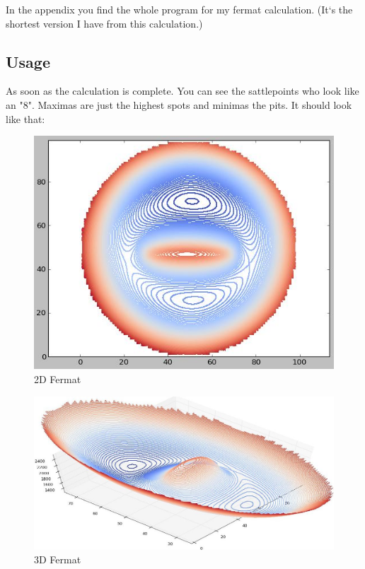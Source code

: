 \documentclass[pdftex,12pt,a4paper]{article}
\begin{document}
In the appendix you find the whole program for my fermat calculation. (It`s the shortest version I have from this calculation.)

\subsection{Usage}

As soon as the calculation is complete. You can see the sattlepoints who look like an "8". Maximas are just the highest spots and minimas the pits. It should look like that:

\begin{figure}[position=h]
\centering
 \caption{2D Fermat}
 \includegraphics[width=12cm]{Bilder/Fermat2}%
\end{figure}

\begin{figure}[position=h]
\centering
 \caption{3D Fermat}
 \includegraphics[width=12cm]{Bilder/Fermat}%
\end{figure}
\end{document}
